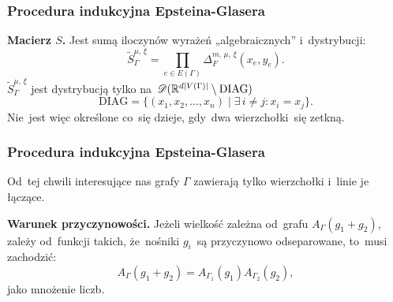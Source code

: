 \documentclass[10pt,t]{beamer}
\newcommand{\DIAG}{\textrm{DIAG}}
\begin{document}
\begin{frame}
  \frametitle{Procedura indukcyjna Epsteina-Glasera}


  \textbf{Macierz $S$.}
  Jest sumą iloczynów wyrażeń „algebraicznych” i~dystrybucji:
  \begin{equation}
    \label{eq:Epstein-Glaser-21}
    \widetilde{S}_{ \Gamma }^{ \mu,\, \xi } =
    \prod\limits_{ e \in E( \Gamma ) } \Delta_{ F }^{ m,\, \mu,\, \xi }( x_{ e }, y_{ e } ).
  \end{equation}
  $\widetilde{S}_{ \Gamma }^{ \mu,\, \xi }$ jest dystrybucją tylko
  na~$\Dcal( \Rbb^{ d | V( \Gamma ) | } \setminus \DIAG )$
  \begin{equation}
    \label{eq:Epstein-Glaser-22}
    \DIAG =
    \{ ( x_{ 1 }, x_{ 2 }, \ldots, x_{ n } ) \; | \; \exists\, i \neq j : x_{ i } = x_{ j } \}.
  \end{equation}
  Nie~jest więc określone co~się dzieje, gdy~dwa wierzchołki~się
  zetkną.

\end{frame}





\begin{frame}
  \frametitle{Procedura indukcyjna Epsteina-Glasera}


  Od~tej chwili interesujące nas grafy $\Gamma$ zawierają tylko wierzchołki
  i~linie je łączące.

  \textbf{Warunek przyczynowości.}
  Jeżeli wielkość zależna od~grafu
  $A_{ \Gamma }( g _{ 1 } + g_{ 2 } )$, zależy od~funkcji takich,
  że~nośniki $g_{ i }$~są przyczynowo odseparowane, to~musi zachodzić:
  \begin{equation}
    \label{eq:Epstein-Glaser-23}
    A_{ \Gamma }( g _{ 1 } + g_{ 2 } ) =
    A_{ \Gamma_{ 1 } }( g _{ 1 } ) A_{ \Gamma_{ 2 } }( g_{ 2 } ),
  \end{equation}
  jako mnożenie liczb.

\end{frame}
\end{document}
